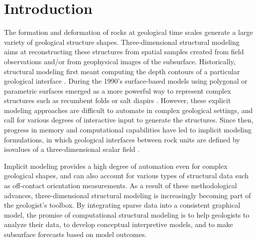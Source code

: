 \documentclass[final]{ring20}
\begin{document}
\section*{Introduction}

The formation and deformation of rocks at geological time scales generate a large variety of geological structure shapes. Three-dimensional structural modeling aims at reconstructing these structures from spatial samples created from field observations and/or from geophysical images of the subsurface. Historically, structural modeling first meant computing the depth contours of a particular geological interface \citep[e.g.,][]{Walters1969AB,Hardy1971JGR,Briggs1974G,Bolondi1976G}. During the 1990's surface-based models using polygonal or parametric surfaces emerged as a more powerful way to represent complex structures such as recumbent folds or salt diapirs \citep{Mallet1992CD,deKemp1999CG}. However, these explicit modeling approaches are difficult to automate in complex geological settings, and call for various degrees of interactive input to generate the structures. Since then, progress in memory and computational capabilities have led to implicit modeling formulations, in which geological interfaces between rock units are defined by isovalues of a three-dimensional scalar field \citep{Lajaunie1997MG,Cowan2002ASGMEM,Calcagno2008PEPI,Frank2007CG,Caumon2013GaRSITo,Souche20137ECEISE2,Hillier2014MG,Laurent2016MG,Laurent2016EaPSL,Martin2017CG,Grose2017JSG,delaVarga2018GMDD,Irakarama2018EAGE,Grose2019JoSG,Renaudeau2019BEMRMX,Renaudeau2019MG,Manchuk2019C&G}.

Implicit modeling provides a high degree of automation even for complex geological shapes, and can also account for various types of structural data such as off-contact orientation  measurements. As a result of these methodological advances, three-dimensional structural modeling is increasingly becoming part of the geologist's toolbox. By integrating sparse data into a consistent graphical model, the promise of computational structural modeling is to help geologists to analyze their data, to develop conceptual interpretive models, and to make subsurface forecasts based on model outcomes. 
\end{document}
